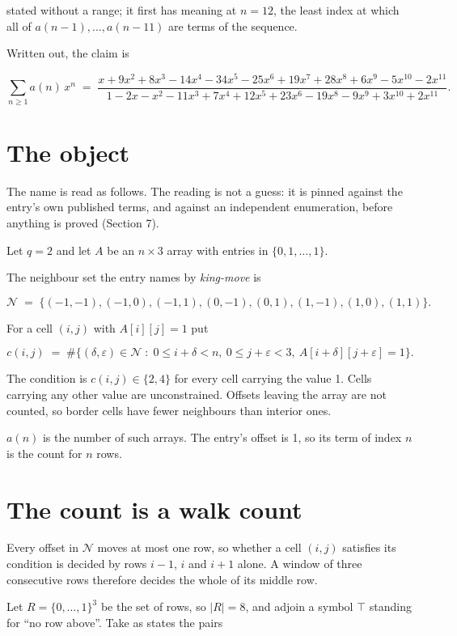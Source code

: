 \documentclass[11pt]{article}
\theoremstyle{definition}
\begin{document}
stated without a range; it first has meaning at $n = 12$, the least index at which all of $a(n-1),\dots,a(n-11)$ are terms of the sequence.

Written out, the claim is

\[\sum_{n \ge 1} a(n)\,x^n \;=\; \frac{x + 9x^{2} + 8x^{3} - 14x^{4} - 34x^{5} - 25x^{6} + 19x^{7} + 28x^{8} + 6x^{9} - 5x^{10} - 2x^{11}}{1 - 2x - x^{2} - 11x^{3} + 7x^{4} + 12x^{5} + 23x^{6} - 19x^{8} - 9x^{9} + 3x^{10} + 2x^{11}}.\]

\section{The object}

The name is read as follows. The reading is not a guess: it is pinned against the entry's own published terms, and against an independent enumeration, before anything is proved (Section 7).

Let $q = 2$ and let $A$ be an $n \times 3$ array with entries in $\{0,1,\dots,1\}$.

The neighbour set the entry names by {\itshape king-move} is

\[\mathcal{N} \;=\; \{(-1,-1), (-1,0), (-1,1), (0,-1), (0,1), (1,-1), (1,0), (1,1)\}.\]

For a cell $(i,j)$ with $A[i][j] = 1$ put

\[c(i,j) \;=\; \#\bigl\{(\delta,\varepsilon)\in\mathcal{N} \;:\; 0\le i+\delta<n,\ 0\le j+\varepsilon<3,\ A[i+\delta][j+\varepsilon] = 1\bigr\}.\]

The condition is $c(i,j) \in \{2, 4\}$ for every cell carrying the value 1. Cells carrying any other value are unconstrained. Offsets leaving the array are not counted, so border cells have fewer neighbours than interior ones.

$a(n)$ is the number of such arrays. The entry's offset is 1, so its term of index $n$ is the count for $n$ rows.

\section{The count is a walk count}

Every offset in $\mathcal{N}$ moves at most one row, so whether a cell $(i,j)$ satisfies its condition is decided by rows $i-1$, $i$ and $i+1$ alone. A window of three consecutive rows therefore decides the whole of its middle row.

Let $R = \{0,\dots,1\}^{3}$ be the set of rows, so $|R| = 8$, and adjoin a symbol $\top$ standing for ``no row above''. Take as states the pairs
\end{document}
